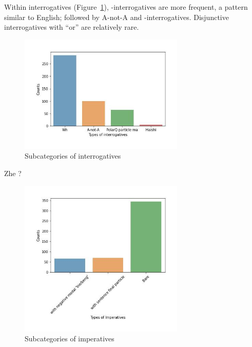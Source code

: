 Within interrogatives (Figure~\ref{fig:man:real-subint}), \twh-interrogatives are more frequent, a pattern similar to English; followed by A-not-A and -interrogatives. Disjunctive interrogatives with  ``or'' are relatively rare. 
\begin{figure}[H]
    \centering
    \includegraphics[width=0.7\textwidth]{figures/man-real-subint.jpg}
    \caption{Subcategories of interrogatives}
    \label{fig:man:real-subint}
\end{figure}

\bxl\label{ex:man:int:wh}
\gll Zhe ?\\

\ex\label{ex:man:int:anota}
\ex\label{ex:man:int:ma}
\ex\label{ex:man:int:haishi}
\exl
\eex

\begin{figure}[H]
    \centering
    \includegraphics[width=0.7\textwidth]{figures/man-real-subimp.jpg}
    \caption{Subcategories of imperatives}
    \label{fig:man:real-subimp}
\end{figure}

